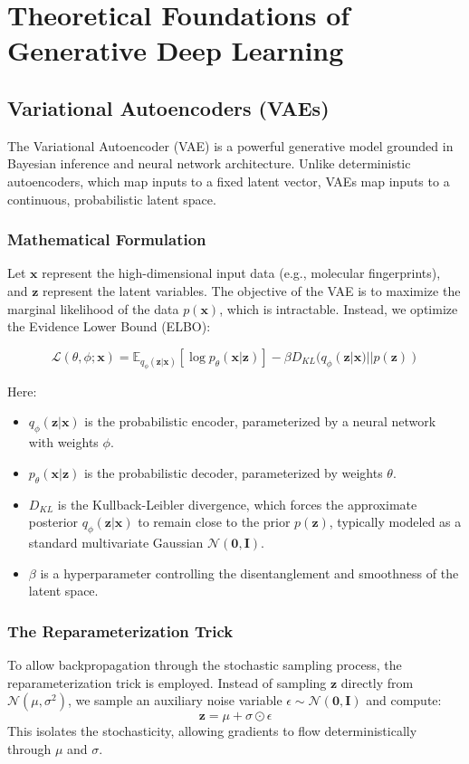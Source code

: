 \section{Theoretical Foundations of Generative Deep Learning}

\subsection{Variational Autoencoders (VAEs)}
The Variational Autoencoder (VAE) is a powerful generative model grounded in Bayesian inference and neural network architecture. Unlike deterministic autoencoders, which map inputs to a fixed latent vector, VAEs map inputs to a continuous, probabilistic latent space.

\subsubsection{Mathematical Formulation}
Let $\mathbf{x}$ represent the high-dimensional input data (e.g., molecular fingerprints), and $\mathbf{z}$ represent the latent variables. The objective of the VAE is to maximize the marginal likelihood of the data $p(\mathbf{x})$, which is intractable. Instead, we optimize the Evidence Lower Bound (ELBO):

\begin{equation}
\mathcal{L}(\theta, \phi; \mathbf{x}) = \mathbb{E}_{q_\phi(\mathbf{z}|\mathbf{x})} [\log p_\theta(\mathbf{x}|\mathbf{z})] - \beta D_{KL}(q_\phi(\mathbf{z}|\mathbf{x}) || p(\mathbf{z}))
\end{equation}

Here:
\begin{itemize}
    \item $q_\phi(\mathbf{z}|\mathbf{x})$ is the probabilistic encoder, parameterized by a neural network with weights $\phi$.
    \item $p_\theta(\mathbf{x}|\mathbf{z})$ is the probabilistic decoder, parameterized by weights $\theta$.
    \item $D_{KL}$ is the Kullback-Leibler divergence, which forces the approximate posterior $q_\phi(\mathbf{z}|\mathbf{x})$ to remain close to the prior $p(\mathbf{z})$, typically modeled as a standard multivariate Gaussian $\mathcal{N}(\mathbf{0}, \mathbf{I})$.
    \item $\beta$ is a hyperparameter controlling the disentanglement and smoothness of the latent space.
\end{itemize}

\subsubsection{The Reparameterization Trick}
To allow backpropagation through the stochastic sampling process, the reparameterization trick is employed. Instead of sampling $\mathbf{z}$ directly from $\mathcal{N}(\mu, \sigma^2)$, we sample an auxiliary noise variable $\epsilon \sim \mathcal{N}(\mathbf{0}, \mathbf{I})$ and compute:
\begin{equation}
\mathbf{z} = \mu + \sigma \odot \epsilon
\end{equation}
This isolates the stochasticity, allowing gradients to flow deterministically through $\mu$ and $\sigma$.

